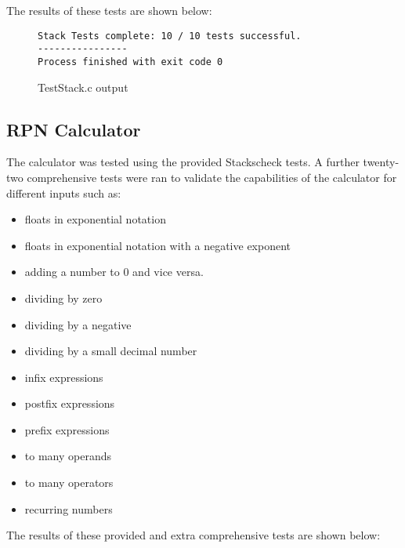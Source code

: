 \documentclass{article}
\begin{document}
\noindent The results of these tests are shown below:

\begin{figure}[H]
\begin{verbatim}
Stack Tests complete: 10 / 10 tests successful.
----------------
Process finished with exit code 0
\end{verbatim}
\caption{TestStack.c output}


\end{figure}

\subsection{RPN Calculator}
The calculator was tested using the provided Stackscheck tests. A further twenty-two comprehensive tests were ran to validate the capabilities of the calculator for different inputs such as:
\begin{itemize}
\item floats in exponential notation
\item floats in exponential notation with a negative exponent
\item adding a number to 0 and vice versa.
\item dividing by zero
\item dividing by a negative
\item dividing by a small decimal number
\item infix expressions
\item postfix expressions
\item prefix expressions
\item to many operands
\item to many operators
\item recurring numbers \\
\end{itemize}

\noindent The results of these provided and extra comprehensive tests are shown below:
\end{document}
